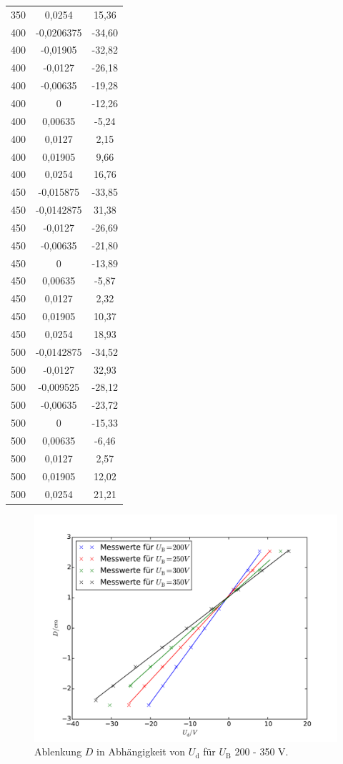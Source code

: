 \begin{table}
{\begin{tabular}{c c c}
350 & 0,0254 & 15,36 \\
400 & -0,0206375 & -34,60 \\
400 &-0,01905 & -32,82 \\
400 & -0,0127 & -26,18 \\
400 & -0,00635 &-19,28 \\
400 & 0 &-12,26 \\
400 & 0,00635 &-5,24 \\
400 & 0,0127 & 2,15 \\
400 & 0,01905 & 9,66 \\
400 & 0,0254 &16,76 \\
450 & -0,015875 & -33,85 \\
450 &-0,0142875 & 31,38 \\
450 & -0,0127 & -26,69 \\
450 & -0,00635 & -21,80 \\
450 & 0 & -13,89 \\
450 & 0,00635 & -5,87 \\
450 & 0,0127 & 2,32 \\
450 & 0,01905 & 10,37 \\
450 & 0,0254 & 18,93 \\
500 & -0,0142875 & -34,52 \\
500 &-0,0127 & 32,93 \\
500 & -0,009525 & -28,12 \\
500 & -0,00635 & -23,72 \\
500 & 0 & -15,33 \\
500 & 0,00635 & -6,46 \\
500 & 0,0127 & 2,57 \\
500 & 0,01905 & 12,02 \\
500 & 0,0254 & 21,21 \\
\bottomrule
\end{tabular}
}
\end{table}

\begin{figure}
  \centering
  \includegraphics[scale=0.8]{auswertung/501-a1.pdf}
\caption{Ablenkung $D$ in Abhängigkeit von $U_\mathrm{d}$ für $U_\mathrm{B}$ 200 - 350 \si{\volt}.}
  \label{fig:empfindlichkeit1}
\end{figure}

